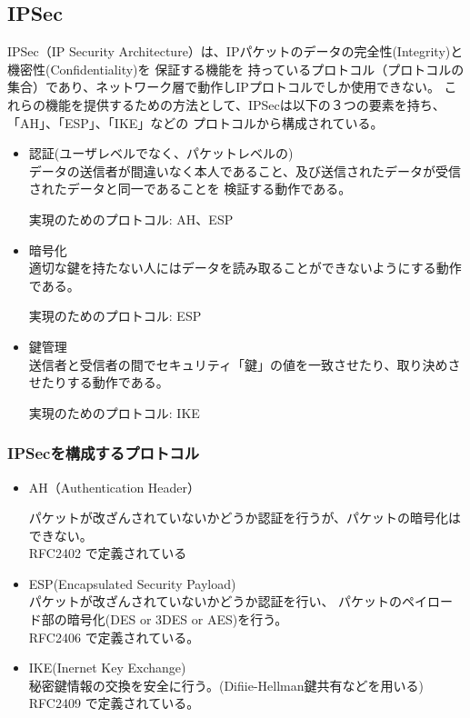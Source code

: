 \documentclass[11pt,a4j,titlepage]{jreport}
\begin{document}
\subsection{IPSec}
IPSec（IP Security Architecture）は、IPパケットのデータの完全性(Integrity)と機密性(Confidentiality)を
保証する機能を
持っているプロトコル（プロトコルの集合）であり、ネットワーク層で動作しIPプロトコルでしか使用できない。
これらの機能を提供するための方法として、IPSecは以下の３つの要素を持ち、「AH」、「ESP」、「IKE」などの
プロトコルから構成されている。
\begin{itemize}
    \item 認証(ユーザレベルでなく、パケットレベルの)\mbox{}\\
    データの送信者が間違いなく本人であること、及び送信されたデータが受信されたデータと同一であることを
    検証する動作である。\par
    実現のためのプロトコル: AH、ESP
    \item 暗号化\mbox{}\\
    適切な鍵を持たない人にはデータを読み取ることができないようにする動作である。\par
    実現のためのプロトコル: ESP
    \item 鍵管理\mbox{}\\
    送信者と受信者の間でセキュリティ「鍵」の値を一致させたり、取り決めさせたりする動作である。\par
    実現のためのプロトコル: IKE
\end{itemize}

\subsubsection{IPSecを構成するプロトコル}

\begin{itemize}
    \item AH（Authentication Header）\mbox{}\par
    パケットが改ざんされていないかどうか認証を行うが、パケットの暗号化はできない。\\RFC2402 \cite{RFC2402}で定義されている

    \item ESP(Encapsulated Security Payload)\mbox{}\\
    パケットが改ざんされていないかどうか認証を行い、
    パケットのペイロード部の暗号化(DES or 3DES or AES)を行う。\\RFC2406 \cite{RFC2406}で定義されている。 
    \item IKE(Inernet Key Exchange)\mbox{}\\
    秘密鍵情報の交換を安全に行う。(Difiie-Hellman鍵共有などを用いる)
    \\RFC2409 \cite{RFC2409}で定義されている。
\end{itemize}
\end{document}
